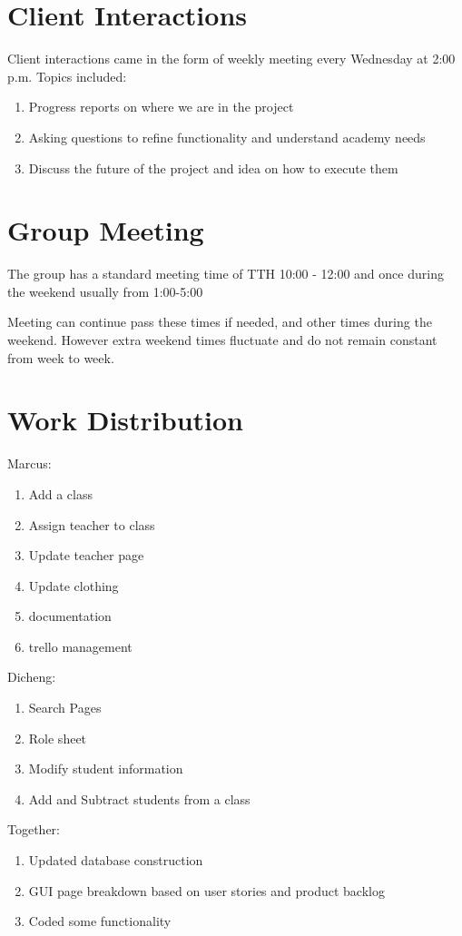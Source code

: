 \documentclass[11pt]{book}
\begin{document}
\section{Client Interactions}

Client interactions came in the form of weekly meeting every Wednesday at 2:00 p.m. Topics included:

\begin{enumerate}
\item Progress reports on where we are in the project
\item Asking questions to refine functionality and understand academy needs
\item Discuss the future of the project and idea on how to execute them
\end{enumerate}


\section{Group Meeting}

The group has a standard meeting time of TTH 10:00 - 12:00 and once during the weekend usually from 1:00-5:00 

Meeting can continue pass these times if needed, and other times during the weekend. However extra weekend times fluctuate and do not remain constant from week to week. 

\section{Work Distribution}

Marcus:
\begin{enumerate}
\item Add a class
\item Assign teacher to class
\item Update teacher page
\item Update clothing
\item documentation
\item trello management\\
\end{enumerate}

Dicheng:
\begin{enumerate}
\item Search Pages
\item Role sheet
\item Modify student information
\item Add and Subtract students from a class\\
\end{enumerate}


Together:
\begin{enumerate}
\item Updated database construction
\item GUI page breakdown based on user stories and product backlog
\item Coded some functionality
\end{enumerate}
\end{document}
